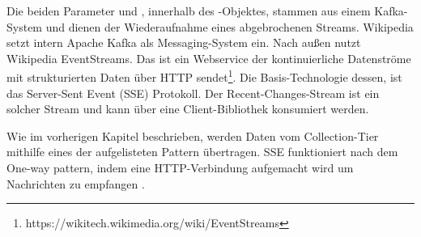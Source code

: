 Die beiden Parameter  und , innerhalb des -Objektes, stammen aus einem Kafka-System
und dienen der Wiederaufnahme eines abgebrochenen Streams. Wikipedia setzt intern Apache Kafka als Messaging-System ein.
Nach außen nutzt Wikipedia EventStreams. Das ist ein Webservice der kontinuierliche Datenströme mit strukturierten Daten
über HTTP sendet\footnote{https://wikitech.wikimedia.org/wiki/EventStreams}. Die Basis-Technologie dessen, ist
das Server-Sent Event (SSE) Protokoll. Der Recent-Changes-Stream ist ein solcher Stream und kann über eine Client-Bibliothek
konsumiert werden.

Wie im vorherigen Kapitel beschrieben, werden Daten vom Collection-Tier mithilfe eines der aufgelisteten Pattern übertragen.
SSE funktioniert nach dem One-way pattern, indem eine HTTP-Verbindung aufgemacht wird um Nachrichten zu empfangen \cite{EventSource_SSE}.

